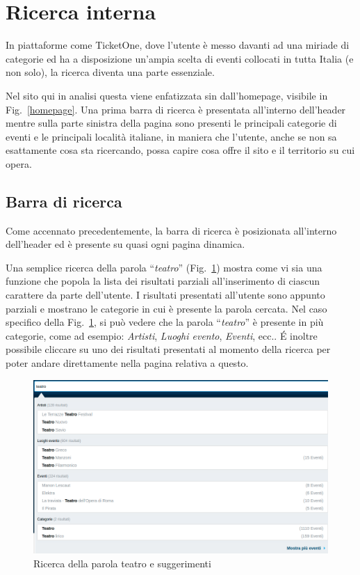 \section{Ricerca interna}\label{ricerca}

In piattaforme come TicketOne, dove l'utente è messo davanti ad una miriade di categorie ed ha a disposizione un'ampia scelta di eventi collocati in tutta Italia (e non solo), la ricerca diventa una parte essenziale.
\par Nel sito qui in analisi questa viene enfatizzata sin dall'homepage, visibile in Fig.~\ref{homepage}.
Una prima barra di ricerca è presentata all'interno dell'header mentre sulla parte sinistra della pagina sono presenti le principali categorie di eventi e le principali località italiane, in maniera che l'utente, anche se non sa esattamente cosa sta ricercando, possa capire cosa offre il sito e il territorio su cui opera.

\subsection{Barra di ricerca}

	Come accennato precedentemente, la barra di ricerca è posizionata all'interno dell'header ed è presente su quasi ogni pagina dinamica.
	\par Una semplice ricerca della parola ``\textit{teatro}'' (Fig.~\ref{ricerca1}) mostra come vi sia una funzione che popola la lista dei risultati parziali all'inserimento di ciascun carattere da parte dell'utente.
	I risultati presentati all'utente sono appunto parziali e mostrano le categorie in cui è presente la parola cercata.
	Nel caso specifico della Fig.~\ref{ricerca1}, si può vedere che la parola ``\textit{teatro}'' è presente in più categorie, come ad esempio: \textit{Artisti}, \textit{Luoghi evento}, \textit{Eventi}, ecc..
	\'E inoltre possibile cliccare su uno dei risultati presentati al momento della ricerca per poter andare direttamente nella pagina relativa a questo.
	
	\begin{figure}[hbt]
		\centering
		\includegraphics[width=\textwidth]{img/ricerca_1.png}
		\caption{Ricerca della parola teatro e suggerimenti}
		\label{ricerca1}
	\end{figure}

